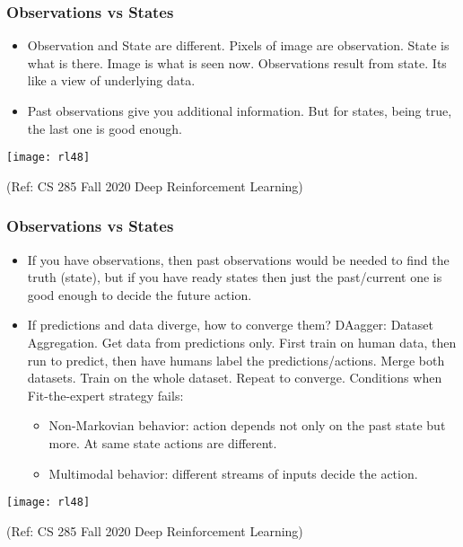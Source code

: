 \begin{frame}[fragile]\frametitle{Observations vs States}

\begin{itemize}
\item Observation and State are different. Pixels of image are observation. State is what is there. Image is what is seen now. Observations result from state. Its like a view of underlying data.
\item Past observations give you additional information. But for states, being true, the last one is good enough.
\end{itemize}


\begin{center}
\texttt{[image: rl48]}
\end{center}


{\tiny (Ref: CS 285 Fall 2020 Deep Reinforcement Learning)}

\end{frame}

\begin{frame}[fragile]\frametitle{Observations vs States}

\begin{itemize}
\item If you have observations, then past observations would be needed to find the truth (state), but if you have ready states then just the past/current one is good enough to decide the future action.
\item If predictions and data diverge, how to converge them? DAagger: Dataset Aggregation. Get data from predictions only. First train on human data, then run to predict, then have humans label the predictions/actions. Merge both datasets. Train on the whole dataset. Repeat to converge.
Conditions when Fit-the-expert strategy fails:
\begin{itemize}
\item Non-Markovian behavior: action depends not only on the past state but more. At same state actions are different.
\item 	Multimodal behavior: different streams of inputs decide the action.
\end{itemize}

\end{itemize}


\begin{center}
\texttt{[image: rl48]}
\end{center}


{\tiny (Ref: CS 285 Fall 2020 Deep Reinforcement Learning)}

\end{frame}

